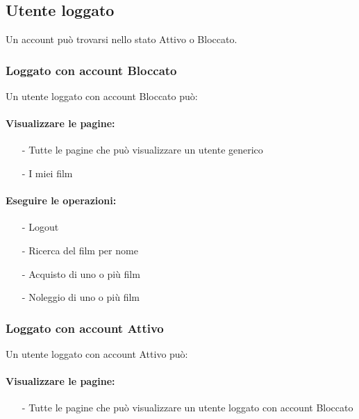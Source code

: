 \documentclass[a4paper]{article}
\begin{document}
\subsection{Utente loggato}
    Un account può trovarsi nello stato Attivo o Bloccato.
    
    \subsubsection{Loggato con account Bloccato}
    Un utente loggato con account Bloccato può:
    
    \paragraph*{Visualizzare le pagine:}
    \begin{itemize}
        \item[-] Tutte le pagine che può visualizzare un utente generico
        \item[-] I miei film
    \end{itemize}

    \paragraph*{Eseguire le operazioni:}
    \begin{itemize}
        \item[-] Logout
        \item[-] Ricerca del film per nome
        \item[-] Acquisto di uno o più film
        \item[-] Noleggio di uno o più film
    \end{itemize}

    \subsubsection{Loggato con account Attivo}
    Un utente loggato con account Attivo può:

    \paragraph*{Visualizzare le pagine:}
    \begin{itemize}
        \item[-] Tutte le pagine che può visualizzare un utente loggato con account Bloccato
    \end{itemize}
\end{document}
